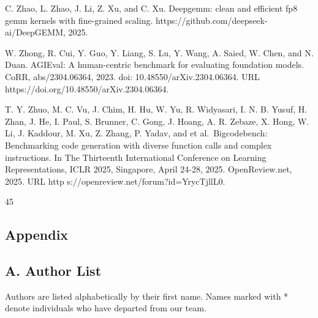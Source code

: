 \documentclass[
  10
]{article}
\begin{document}
C. Zhao, L. Zhao, J. Li, Z. Xu, and C. Xu. Deepgemm: clean and efficient
fp8 gemm kernels with fine-grained scaling.
https://github.com/deepseek-ai/DeepGEMM, 2025.

W. Zhong, R. Cui, Y. Guo, Y. Liang, S. Lu, Y. Wang, A. Saied, W. Chen,
and N. Duan. AGIEval: A human-centric benchmark for evaluating
foundation models. CoRR, abs/2304.06364, 2023. doi:
10.48550/arXiv.2304.06364. URL
https://doi.org/10.48550/arXiv.2304.06364.

T. Y. Zhuo, M. C. Vu, J. Chim, H. Hu, W. Yu, R. Widyasari, I. N. B.
Yusuf, H. Zhan, J. He, I. Paul, S. Brunner, C. Gong, J. Hoang, A. R.
Zebaze, X. Hong, W. Li, J. Kaddour, M. Xu, Z. Zhang, P. Yadav, and et
al.~Bigcodebench: Benchmarking code generation with diverse function
calls and complex instructions. In The Thirteenth International
Conference on Learning Representations, ICLR 2025, Singapore, April
24-28, 2025. OpenReview.net, 2025. URL http
s://openreview.net/forum?id=YrycTjllL0.

45

\subsection{Appendix}\label{appendix}

\subsection{A. Author List}\label{a.-author-list}

Authors are listed alphabetically by their first name. Names marked with
* denote individuals who have departed from our team.
\end{document}
